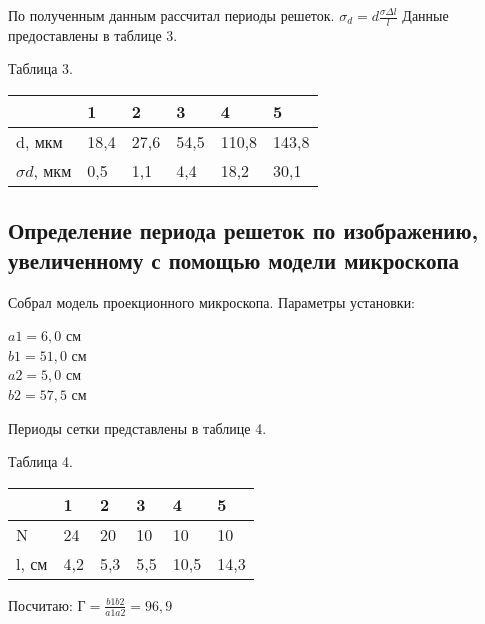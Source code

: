 По полученным данным рассчитал периоды решеток.
$ \sigma_d = d\frac{\sigma{\Delta l}}{l} $
Данные предоставлены в таблице 3.

\begin{table}[h!]
    \begin{center}
    Таблица 3. \\
    \begin{tabular}{|l|l|l|l|l|l|}
    \hline
                      & 1    & 2    & 3    & 4     & 5     \\ \hline
    d, мкм            & 18,4 & 27,6 & 54,5 & 110,8 & 143,8 \\ \hline
    $ \sigma d $, мкм & 0,5  & 1,1  & 4,4  & 18,2  & 30,1  \\ \hline

    \end{tabular}
    \end{center}
\end{table}

\subsection{Определение периода решеток по изображению, увеличенному с помощью модели микроскопа}

Собрал модель проекционного микроскопа. Параметры установки:

\noindent$ a1 = 6,0 $ см \\
\noindent$ b1 = 51,0 $ см \\
\noindent$ a2 = 5,0 $ см \\
\noindent$ b2 = 57,5 $ см

Периоды сетки представлены в таблице 4.

\begin{table}[h!]
    \begin{center}
    Таблица 4. \\
    \begin{tabular}{|l|l|l|l|l|l|}
    \hline
          & 1    & 2    & 3    & 4     & 5     \\ \hline
    N     & 24   & 20   & 10   & 10    & 10    \\ \hline
    l, см & 4,2  & 5,3  & 5,5  & 10,5  & 14,3  \\ \hline

    \end{tabular}
    \end{center}
\end{table}

Посчитаю: $ \texttt{Г} = \frac{b1b2}{a1a2} = 96,9 $

